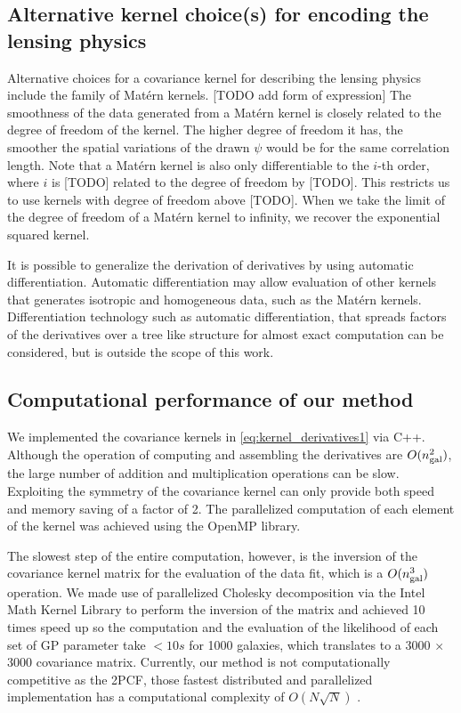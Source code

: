 \subsection{Alternative kernel choice(s) for encoding the lensing physics}
Alternative choices for a covariance kernel for describing the lensing physics 
include the family of Mat\'{e}rn kernels.
[TODO add form of expression] 
The smoothness of the data generated from a Mat\'{e}rn kernel is closely
related to the degree of freedom of the kernel. 
The higher degree of freedom it has, the smoother the spatial variations of the
drawn $\psi$ would be for the same correlation length.
Note that a Mat\'{e}rn kernel is also only differentiable to the $i$-th order,
where $i$ is [TODO] related to the degree of freedom by [TODO].
This restricts us to use kernels with degree of freedom above [TODO]. 
When we take the limit of the degree of freedom of a Mat\'{e}rn kernel to infinity, 
we recover the exponential squared kernel.

It is possible to generalize the derivation of derivatives by using automatic
differentiation. Automatic differentiation may allow evaluation of other
kernels that generates isotropic and homogeneous data, 
such as the Mat\'{e}rn kernels.  
Differentiation technology such as automatic differentiation, 
that spreads factors of the derivatives over a tree like structure for
almost exact computation can be considered, but is outside the scope of this work.

\subsection{Computational performance of our method}
We implemented the covariance kernels in \ref{eq:kernel_derivatives1}
via {\sc C++}. Although the operation of computing and assembling the
derivatives are $O(n_{\rm gal}^2)$, the large number of addition and 
multiplication operations can be slow.
Exploiting the symmetry of the covariance kernel can only provide both speed and
memory saving of a factor of 2.
The parallelized computation of each element of the kernel was achieved using 
the OpenMP library. 


The slowest step of the entire computation, however, is the inversion of the
covariance kernel matrix for the evaluation of the data fit, 
which is a $O(n_{\rm gal}^3)$ operation. 
We made use of parallelized Cholesky decomposition via the Intel Math Kernel Library
to perform the inversion of the matrix and achieved 10 times speed up so the
computation and the evaluation of the likelihood of each set of GP parameter
take $< 10s$ for 1000 galaxies, which translates to a 3000 $\times$ 3000
covariance matrix.
Currently, our method is not computationally competitive as the 2PCF, those
fastest distributed and parallelized 
implementation has a computational complexity of $O(N\sqrt{N})$ \citep{Chhugani2012}.

